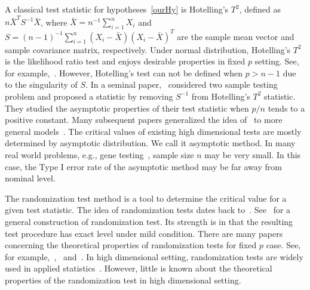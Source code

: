 \documentclass[3p]{elsarticle}
\newcommand{\BP}{\mathbf{P}}
\theoremstyle{plain}
\theoremstyle{definition}
\theoremstyle{remark}
\begin{document}
A classical test statistic for hypotheses~\eqref{ourHy} is Hotelling's $T^2$, defined as
    $
    n\bar{X}^T S^{-1}\bar{X}
    $,
where $\bar{X}=n^{-1}\sum_{i=1}^n X_i$ and $S=(n-1)^{-1}\sum_{i=1}^n (X_i-\bar{X}) (X_i-\bar{X})^T$ are the sample mean vector and sample covariance matrix, respectively.
Under normal distribution, Hotelling's $T^2$ is the likelihood ratio test and enjoys desirable properties in fixed $p$ setting. See, for example,~\citet{andersonMultivariate}.
However, Hotelling's test can not be defined when $p>n-1$ due to the singularity of $S$.
In a seminal paper,~\citet{Bai1996Efiect} considered two sample testing problem and proposed a statistic by removing $S^{-1}$ from Hotelling's $T^2$ statistic.
They studied the asymptotic properties of their test statistic when $p/n$ tends to a positive constant.
Many subsequent papers generalized the idea of~\citet{Bai1996Efiect} to more general models~\citep{Srivastava2008A,Chen2010A,Wang2015A}.
The critical values of existing high dimensional tests are mostly determined by asymptotic distribution. 
We call it asymptotic method.
 In many real world problems, e.g., gene testing~\citep{efron2007on}, sample size $n$ may be very small.
In this case, the Type I error rate of the asymptotic method may be far away from nominal level. 

The randomization test method is a tool to determine the critical value for a given test statistic.
The idea of randomization tests dates back to~\citet{Fisher}.
See~\citet{Romano1990On} for a general construction of randomization test.
Its strength is in that the resulting test procedure has exact level under mild condition.
There are many papers concerning the theoretical properties of randomization tests for fixed $p$ case.
See, for example,~\citet{Romano1990On},~\citet{Zhu2000N} and~\citet{Chung2016Multivariate}.
In high dimensional setting, randomization tests are widely used in applied statistics~\citep{Subramanian2005,efron2007on,Ko2016}.
However, little is known about the theoretical properties of the randomization test in high dimensional setting.
\end{document}
